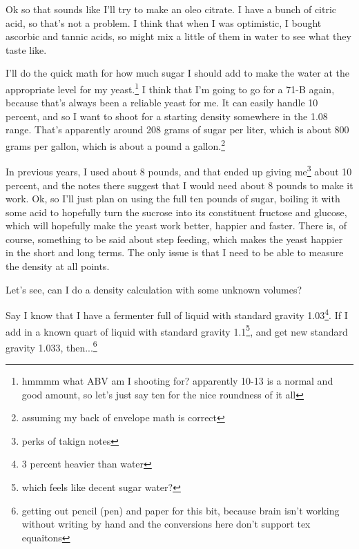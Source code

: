 \documentclass[12pt]{article}
\renewcommand{\,}{\textsuperscript{,}}
\begin{document}
Ok so that sounds like I'll try to make an oleo citrate.  
I have a bunch of citric acid, so that's not a problem.  
I think that when I was optimistic, I bought ascorbic and tannic acids, so might mix a little of them in water to see what they taste like.

I'll do the quick math for how much sugar I should add to make the water at the appropriate level for my yeast.\footnote{hmmmm what ABV am I shooting for? apparently 10-13 is a normal and good amount, so let's just say ten for the nice roundness of it all}  
I think that I'm going to go for a 71-B again, because that's always been a reliable yeast for me.  
It can easily handle 10 percent, and so I want to shoot for a starting density somewhere in the 1.08 range.  
That's apparently around 208 grams of sugar per liter, which is about 800 grams per gallon, which is about a pound a gallon.\footnote{assuming my back of envelope math is correct}

In previous years, I used about 8 pounds, and that ended up giving me\footnote{perks of takign notes} about 10 percent, and the notes there suggest that I would need about 8 pounds to make it work.  
Ok, so I'll just plan on using the full ten pounds of sugar, boiling it with some acid to hopefully turn the sucrose into its constituent fructose and glucose, which will hopefully make the yeast work better, happier and faster.  
There is, of course, something to be said about step feeding, which makes the yeast happier in the short and long terms.  
The only issue is that I need to be able to measure the density at all points.

Let's see, can I do a density calculation with some unknown volumes?

Say I know that I have a fermenter full of liquid with standard gravity 1.03\footnote{3 percent heavier than water}.  
If I add in a known quart of liquid with standard gravity 1.1\footnote{which feels like decent sugar water?}, and get new standard gravity 1.033, then...\footnote{getting out pencil (pen) and paper for this bit, because brain isn't working without writing by hand and the conversions here don't support tex equaitons}
\end{document}
